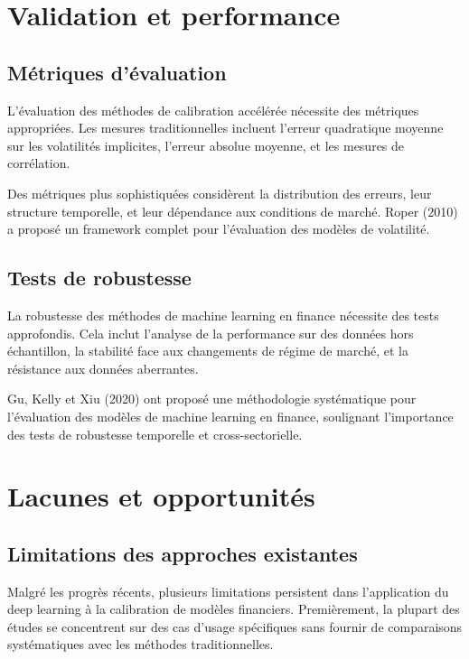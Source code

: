 \section{Validation et performance}

\subsection{Métriques d'évaluation}

L'évaluation des méthodes de calibration accélérée nécessite des métriques appropriées. Les mesures traditionnelles incluent l'erreur quadratique moyenne sur les volatilités implicites, l'erreur absolue moyenne, et les mesures de corrélation.

Des métriques plus sophistiquées considèrent la distribution des erreurs, leur structure temporelle, et leur dépendance aux conditions de marché. Roper (2010) a proposé un framework complet pour l'évaluation des modèles de volatilité.

\subsection{Tests de robustesse}

La robustesse des méthodes de machine learning en finance nécessite des tests approfondis. Cela inclut l'analyse de la performance sur des données hors échantillon, la stabilité face aux changements de régime de marché, et la résistance aux données aberrantes.

Gu, Kelly et Xiu (2020) ont proposé une méthodologie systématique pour l'évaluation des modèles de machine learning en finance, soulignant l'importance des tests de robustesse temporelle et cross-sectorielle.

\section{Lacunes et opportunités}

\subsection{Limitations des approches existantes}

Malgré les progrès récents, plusieurs limitations persistent dans l'application du deep learning à la calibration de modèles financiers. Premièrement, la plupart des études se concentrent sur des cas d'usage spécifiques sans fournir de comparaisons systématiques avec les méthodes traditionnelles.

